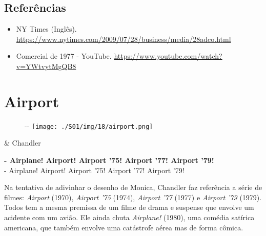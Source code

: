 \hypertarget{referuxeancias-13}{%
\subsection{Referências}\label{referuxeancias-13}}

\begin{itemize}
\tightlist
\item
  \sloppy NY Times (Inglês). \url{https://www.nytimes.com/2009/07/28/business/media/28adco.html}
\item
  \sloppy Comercial de 1977 - YouTube. \url{https://www.youtube.com/watch?v=YWtvytMgQB8}
\end{itemize}

\hypertarget{airport}{%
\section{Airport}\label{airport}}

\begin{figure}[!ht]
  \begin{adjustwidth}{-\oddsidemargin-1in}{-\rightmargin}
    \centering
    \texttt{[image: ./S01/img/18/airport.png]}
  \end{adjustwidth}
\end{figure}

\begin{tcolorbox}[enhanced,center upper,
    drop fuzzy shadow southeast, boxrule=0.3pt,
    lower separated=false, breakable,
    colframe=black!30!dialogoBorder,colback=white]
\begin{minipage}[c]{0.16\linewidth}
   & \centering \scriptsize{Chandler}
\end{minipage}
\hfill
\begin{minipage}[c]{0.8\linewidth}
  \textbf{- Airplane! Airport! Airport '75! Airport '77! Airport '79!}\\
  - Airplane! Airport! Airport '75! Airport '77! Airport '79!
\end{minipage}
\end{tcolorbox}

Na tentativa de adivinhar o desenho de Monica, Chandler faz referência a
série de filmes: \emph{Airport} (1970), \emph{Airport '75} (1974),
\emph{Airport '77} (1977) e \emph{Airport '79} (1979). Todos tem a mesma
premissa de um filme de drama e suspense que envolve um acidente com um
avião. Ele ainda chuta \emph{Airplane!} (1980), uma comédia satírica
americana, que também envolve uma catástrofe aérea mas de forma cômica.

